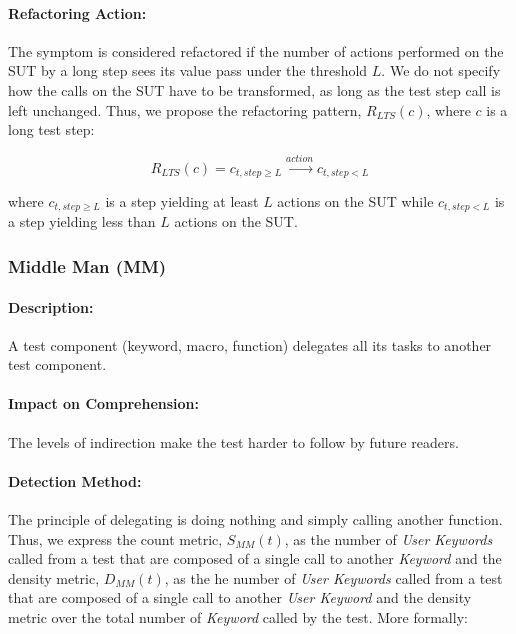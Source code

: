 \paragraph{Refactoring Action:}

The symptom is considered refactored if the number of actions performed on the SUT by a long step sees its value pass under the threshold $L$. We do not specify how the calls on the SUT have to be transformed, as long as the test step call is left unchanged. Thus, we propose the refactoring pattern, $R_{LTS}(c)$, where $c$ is a long test step:

\begin{equation*}
    R_{LTS}(c) = c_{t, step\geq L} \xrightarrow{action} c_{t, step < L}
\end{equation*}

where $c_{t, step\geq L}$ is a step yielding at least $L$ actions on the SUT while $c_{t, step < L}$ is a step yielding less than $L$ actions on the SUT.

\subsubsection{Middle Man (MM)}

\paragraph{Description:}

A test component (keyword, macro, function) delegates all its tasks to another test component.

\paragraph{Impact on Comprehension:} The levels of indirection make the test harder to follow by future readers.

\paragraph{Detection Method:}

The principle of delegating is doing nothing and simply calling another function. Thus, we express the count metric, $S_{MM}(t)$, as the number of \emph{User Keywords} called from a test that are composed of a single call to another \emph{Keyword} and the density metric, $D_{MM}(t)$, as the he number of \emph{User Keywords} called from a test that are composed of a single call to another \emph{User Keyword} and the density metric over the total number of \emph{Keyword} called by the test. More formally:

